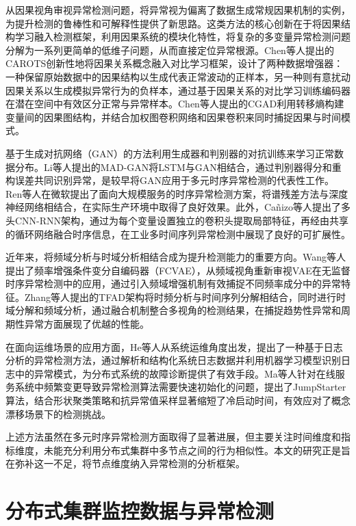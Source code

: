 从因果视角审视异常检测问题，将异常视为偏离了数据生成常规因果机制的实例，为提升检测的鲁棒性和可解释性提供了新思路。这类方法的核心创新在于将因果结构学习融入检测框架，利用因果系统的模块化特性，将复杂的多变量异常检测问题分解为一系列更简单的低维子问题，从而直接定位异常根源。Chen等人\cite{chen2025carots}提出的CAROTS创新性地将因果关系概念融入对比学习框架，设计了两种数据增强器：一种保留原始数据中的因果结构以生成代表正常波动的正样本，另一种则有意扰动因果关系以生成模拟异常行为的负样本，通过基于因果关系的对比学习训练编码器在潜在空间中有效区分正常与异常样本。Chen等人\cite{chen2025cgad}提出的CGAD利用转移熵构建变量间的因果图结构，并结合加权图卷积网络和因果卷积来同时捕捉因果与时间模式。

基于生成对抗网络（GAN）\cite{goodfellow2014gan}的方法利用生成器和判别器的对抗训练来学习正常数据分布。Li等人\cite{li2019madgan}提出的MAD-GAN将LSTM与GAN相结合，通过判别器得分和重构误差共同识别异常，是较早将GAN应用于多元时序异常检测的代表性工作。Ren等人\cite{ren2019srnn}在微软提出了面向大规模服务的时序异常检测方案，将谱残差方法与深度神经网络相结合，在实际生产环境中取得了良好效果。此外，Ca{\~n}izo等人\cite{canizo2019multihead}提出了多头CNN-RNN架构，通过为每个变量设置独立的卷积头提取局部特征，再经由共享的循环网络融合时序信息，在工业多时间序列异常检测中展现了良好的可扩展性。

近年来，将频域分析与时域分析相结合成为提升检测能力的重要方向。Wang等人\cite{wang2024fcvae}提出了频率增强条件变分自编码器（FCVAE），从频域视角重新审视VAE在无监督时序异常检测中的应用，通过引入频域增强机制有效捕捉不同频率成分中的异常特征。Zhang等人\cite{zhang2022tfad}提出的TFAD架构将时频分析与时间序列分解相结合，同时进行时域分解和频域分析，通过融合机制整合多视角的检测结果，在捕捉趋势性异常和周期性异常方面展现了优越的性能。

在面向运维场景的应用方面，He等人\cite{he2016loganalysis}从系统运维角度出发，提出了一种基于日志分析的异常检测方法，通过解析和结构化系统日志数据并利用机器学习模型识别日志中的异常模式，为分布式系统的故障诊断提供了有效手段。Ma等人\cite{ma2021jumpstarter}针对在线服务系统中频繁变更导致异常检测算法需要快速初始化的问题，提出了JumpStarter算法，结合形状聚类策略和抗异常值采样显著缩短了冷启动时间，有效应对了概念漂移场景下的检测挑战。

上述方法虽然在多元时序异常检测方面取得了显著进展，但主要关注时间维度和指标维度，未能充分利用分布式集群中多节点之间的行为相似性。本文的研究正是旨在弥补这一不足，将节点维度纳入异常检测的分析框架。

\section{分布式集群监控数据与异常检测}

